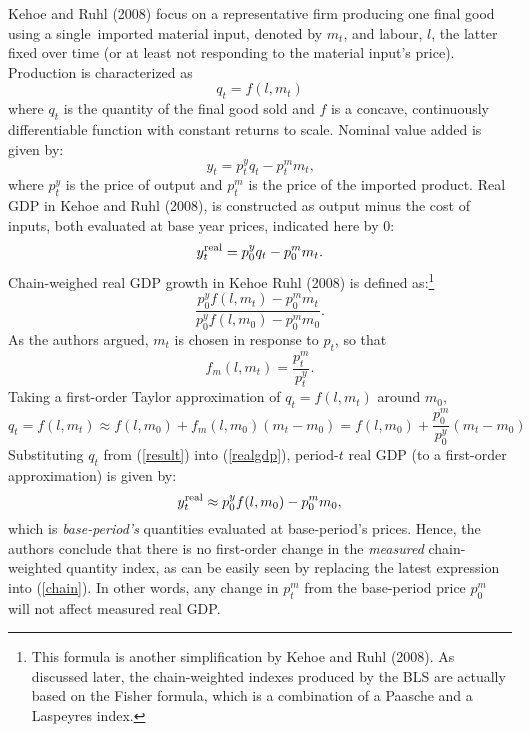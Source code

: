 \documentclass[12pt]{article}
\begin{document}
Kehoe and Ruhl (2008) focus on a representative firm producing one final
good using a single\ imported material input, denoted by $m_{t}$, and
labour, $l$, the latter fixed over time (or at least not responding to the
material input's price). Production is characterized as%
\begin{equation}
q_{t}=f(l,m_{t})  \label{quant}
\end{equation}%
where $q_{t}$ is the quantity of the final good sold and $f$ is a concave,
continuously differentiable function with constant returns to scale. Nominal
value added is given by: 
\begin{equation*}
y_{t}=p_{t}^{y}q_{t}-p_{t}^{m}m_{t}\text{,}
\end{equation*}%
where $p_{t}^{y}$ is the price of output and $p_{t}^{m}$ is the price of the
imported product. Real GDP in Kehoe and Ruhl (2008), is constructed as
output minus the cost of inputs, both evaluated at base year prices,
indicated here by $0$: 
\begin{equation}
y_{t}^{\mathop{\rm real}}=p_{0}^{y}q_{t}-p_{0}^{m}m_{t}.  \label{realgdp}
\end{equation}%
Chain-weighed real GDP growth in Kehoe Ruhl (2008) is defined as:\footnote{%
This formula is another simplification by Kehoe and Ruhl (2008). As
discussed later, the chain-weighted indexes produced by the BLS are actually
based on the Fisher formula, which is a combination of a Paasche and a
Laspeyres index.}%
\begin{equation}
\frac{p_{0}^{y}f(l,m_{t})-p_{0}^{m}m_{t}}{p_{0}^{y}f(l,m_{0})-p_{0}^{m}m_{0}}%
.  \label{chain}
\end{equation}%
As the authors argued, $m_{t}$ is chosen in response to $p_{t}$, so that 
\begin{equation*}
f_{m}(l,m_{t})=\frac{p_{t}^{m}}{p_{t}^{y}}.
\end{equation*}%
Taking a first-order Taylor approximation of $q_{t}=f(l,m_{t})$ around $%
m_{0} $, 
\begin{equation}
q_{t}=f(l,m_{t})\approx f(l,m_{0})+f_{m}(l,m_{0})(m_{t}-m_{0})=f(l,m_{0})+%
\frac{p_{0}^{m}}{p_{0}^{y}}(m_{t}-m_{0})  \label{result}
\end{equation}%
Substituting $q_{t}$ from (\ref{result}) into (\ref{realgdp}), period-$t$
real GDP (to a first-order approximation) is given by: 
\begin{equation*}
y_{t}^{\mathop{\rm real}}\approx p_{0}^{y}f(l,m_{0})-p_{0}^{m}m_{0},
\end{equation*}%
which is \emph{base-period's} quantities evaluated at base-period's prices.
Hence, the authors conclude that there is no first-order change in the 
\textit{measured} chain-weighted quantity index, as can be easily seen by
replacing the latest expression into (\ref{chain}). In other words, any
change in $p_{t}^{m}$ from the base-period price $p_{0}^{m}$ will not affect
measured real GDP.
\end{document}
